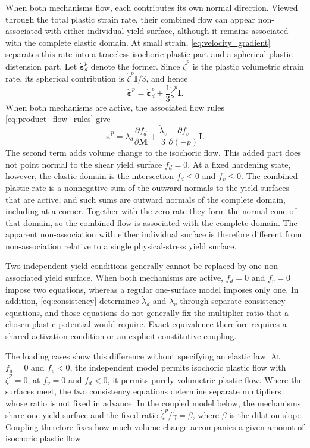 \documentclass[11pt]{article}
\newcommand{\mbf}[1]{\mathbf{#1}}
\newcommand{\bs}[1]{\boldsymbol{#1}}
\begin{document}
When both mechanisms flow, each contributes its own normal direction. Viewed
through the total plastic strain rate, their combined flow can appear
non-associated with either individual yield surface, although it remains
associated with the complete elastic domain. At small strain,
\eqref{eq:velocity_gradient} separates this rate into a traceless isochoric
plastic part and a spherical plastic-distension part.  Let
\(\dot{\bs\varepsilon}^{p}_{d}\) denote the former.  Since \(\dot\zeta^p\) is
the plastic volumetric strain rate, its spherical contribution is
\(\dot\zeta^p\mbf I/3\), and hence
\begin{equation*}
	\dot{\bs\varepsilon}^{p}
	=\dot{\bs\varepsilon}^{p}_{d}
	+\frac{1}{3}\dot\zeta^p\mbf I.
\end{equation*}
When both mechanisms are active, the associated flow rules
\eqref{eq:product_flow_rules} give
\begin{equation*}
	\dot{\bs\varepsilon}^{p}
	=\dot\lambda_d\frac{\partial f_d}{\partial\mbf M}
	+\frac{\dot\lambda_v}{3}
	\frac{\partial f_v}{\partial(-p)}\mbf I.
\end{equation*}
The second term adds volume change to the isochoric flow. This added part does
not point normal to the shear yield surface \(f_d=0\). At a fixed hardening
state, however, the elastic domain is the intersection \(f_d\le0\) and
\(f_v\le0\). The combined plastic rate is a nonnegative sum of the outward
normals to the yield surfaces that are active, and such sums are outward
normals of the complete domain, including at a corner. Together with the zero
rate they form the normal cone of that domain, so the combined flow is
associated with the complete domain. The apparent non-association with either
individual surface is therefore different from non-association relative to a
single physical-stress yield surface.

Two independent yield conditions generally cannot be replaced by one
non-associated yield surface.  When both mechanisms are active,
\(f_d=0\) and \(f_v=0\) impose two equations, whereas a regular one-surface
model imposes only one.  In addition,
\eqref{eq:consistency} determines \(\dot\lambda_d\) and \(\dot\lambda_v\)
through separate consistency equations, and those equations do not generally
fix the multiplier ratio that a chosen plastic potential would require.  Exact
equivalence therefore requires a shared activation condition or an explicit
constitutive coupling.

The loading cases show this difference without specifying an elastic law.  At
\(f_d=0\) and \(f_v<0\), the independent model permits isochoric plastic flow
with \(\dot\zeta^p=0\); at \(f_v=0\) and \(f_d<0\), it permits purely
volumetric plastic flow.  Where the surfaces meet, the two consistency
equations determine separate multipliers whose ratio is not fixed in advance.
In the coupled model below, the mechanisms share one yield surface and the
fixed ratio \(\dot\zeta^p/\dot\gamma=\beta\), where \(\beta\) is the dilation
slope. Coupling therefore fixes how much volume change accompanies a given
amount of isochoric plastic flow.
\end{document}
